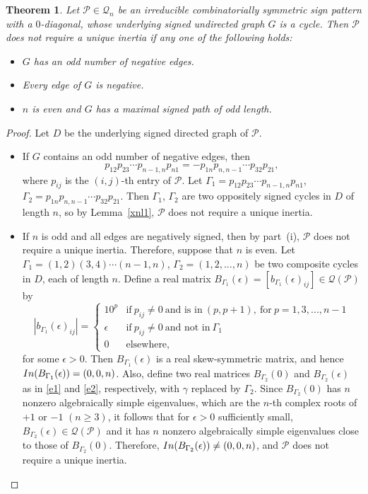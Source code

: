 \documentclass[10pt,a4paper]{amsart}
\newtheorem{theorem}{Theorem}[section]
\numberwithin{equation}{section}
\def\In{{\rm In}}
\begin{document}
\begin{theorem} \label{xxth3}
	Let $\mathcal{P} \in \mathcal{Q}_n$ be an irreducible combinatorially symmetric sign pattern with a $0$-diagonal, whose underlying signed undirected graph $G$ is a cycle. Then $\mathcal{P}$ does not require a unique inertia if any one of the following holds:
	\begin{itemize}
		\item[i.] $G$ has an odd number of negative edges. 
		\item[ii.] Every edge of $G$ is negative.
		\item[iii.] $n$ is even and $G$ has a maximal signed path of odd length.
	\end{itemize}
\end{theorem}

\begin{proof}
	Let $D$ be the underlying signed directed graph of $\mathcal{P}$.
	\begin{itemize}
		\item[i.]  If $G$ contains an odd number of negative edges, then
		$$p_{12}p_{23}\cdots p_{n-1,n} p_{n1}=-p_{1n}p_{n,n-1}\cdots p_{32} p_{21},$$ where $p_{ij}$ is the $(i,j)$-th entry of $\mathcal{P}$.
		Let $\Gamma_1 = p_{12}p_{23}\cdots p_{n-1,n} p_{n1}$, $\Gamma_2 = p_{1n}p_{n,n-1}\cdots p_{32} p_{21}$.
		Then $\Gamma_1$, $\Gamma_2$ are two oppositely signed cycles in $D$ of length $n$, so by Lemma~\ref{xnl1}, $\mathcal{P}$ does not require a unique inertia.
		
		\item[ii.] If $n$ is odd and all edges are negatively signed, then by part~(i), $\mathcal{P}$ does not require a unique inertia. Therefore, suppose that $n$ is even. Let 
		$\Gamma_1=(1,2)(3,4)\cdots (n-1,n)$, $\Gamma_2=(1,2,...,n)$ be two composite cycles in $D$, each of length $n$.  
		Define a real matrix $B_{\Gamma_1}(\epsilon) = [b_{\Gamma_1}(\epsilon)_{ij}] \in \mathcal{Q}(\mathcal{P})$ by
		\begin{equation*}
			|b_{\Gamma_1}(\epsilon)_{ij}|= \begin{cases}
				10^p & \text{if}\ p_{ij}\neq 0 ~\text{and~is~in}~ (p,p+1),~\text{for}~p=1,3,...,n-1 \\
				\epsilon & \text{if}\ p_{ij}\neq 0~\text{and~not~in}~ \Gamma_1 \\
				
				0 & \text{elsewhere,}
			\end{cases}
		\end{equation*}
		for some $\epsilon>0$. Then $B_{\Gamma_1}(\epsilon)$ is a real skew-symmetric matrix, and hence $\In(B_{\Gamma_1}(\epsilon))=(0,0,n)$. Also, define two real matrices $B_{\Gamma_2}(0)$ and $B_{\Gamma_2}(\epsilon)$ as in \eqref{e1} and \eqref{e2}, respectively, with $\gamma$ replaced by $\Gamma_2$. Since $B_{\Gamma_2}(0)$ has $n$ nonzero algebraically simple eigenvalues, which are the $n$-th complex roots of $+1$ or $-1$ $(n\geq 3)$, it follows that for $\epsilon > 0$ sufficiently small, $B_{\Gamma_2}(\epsilon)\in \mathcal{Q}(\mathcal{P})$ and it has $n$ nonzero algebraically simple eigenvalues close to those of $B_{\Gamma_2}(0)$. Therefore, $\In(B_{\Gamma_2}(\epsilon))\neq (0,0,n)$, and $\mathcal{P}$ does not require a unique inertia. 
		

\end{itemize}
\end{proof}
\end{document}
